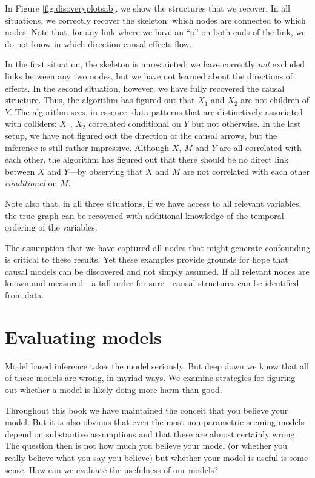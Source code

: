 \documentclass[
  12pt,
]{book}
\newenvironment{headerbox}{
  \definecolor{shadecolor}{rgb}{0.8, 0.8, 0.8}  %
  \color{black}
  \begin{shaded}}{\end{shaded}}
\begin{document}
In Figure \ref{fig:disoveryplotsab}, we show the structures that we recover. In all situations, we correctly recover the skeleton: which nodes are connected to which nodes. Note that, for any link where we have an ``o'' on both ends of the link, we do not know in which direction causal effects flow.

In the first situation, the skeleton is unrestricted: we have correctly \emph{not} excluded links between any two nodes, but we have not learned about the directions of effects. In the second situation, however, we have fully recovered the causal structure. Thus, the algorithm has figured out that \(X_1\) and \(X_2\) are not children of \(Y\). The algorithm sees, in essence, data patterns that are distinctively associated with colliders: \(X_1\), \(X_2\) correlated conditional on \(Y\) but not otherwise. In the last setup, we have not figured out the direction of the causal arrows, but the inference is still rather impressive. Although \(X\), \(M\) and \(Y\) are all correlated with each other, the algorithm has figured out that there should be no direct link between \(X\) and \(Y\)---by observing that \(X\) and \(M\) are not correlated with each other \emph{conditional} on \(M\).

Note also that, in all three situations, if we have access to all relevant variables, the true graph can be recovered with additional knowledge of the temporal ordering of the variables.

The assumption that we have captured all nodes that might generate confounding is critical to these results. Yet these examples provide grounds for hope that causal models can be discovered and not simply assumed. If all relevant nodes are known and measured---a tall order for sure---causal structures can be identified from data.

\hypertarget{evaluation}{%
\chapter{Evaluating models}\label{evaluation}}

\begin{headerbox}
Model based inference takes the model seriously. But deep down we know that all of these models are wrong, in myriad ways. We examine strategies for figuring out whether a model is likely doing more harm than good.

\end{headerbox}

Throughout this book we have maintained the conceit that you believe your model. But it is also obvious that even the most non-parametric-seeming models depend on substantive assumptions and that these are almost certainly wrong. The question then is not how much you believe your model (or whether you really believe what you say you believe) but whether your model is useful is some sense. How can we evaluate the usefulness of our models?
\end{document}
